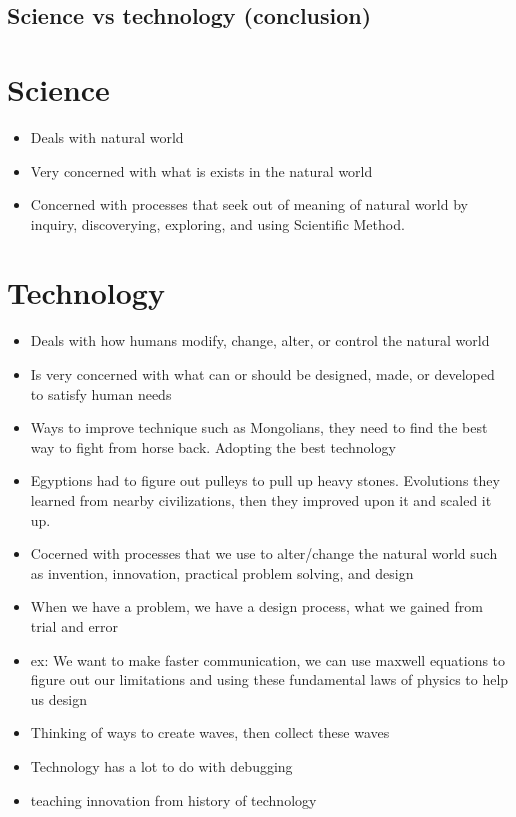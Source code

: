 \documentclass{article}
\begin{document}
\subsection{Science vs technology (conclusion)}

\section*{Science}
\begin{itemize}
  \item Deals with natural world
  \item Very concerned with what is {exists}
    in the natural world
  \item Concerned with processes that seek
    out of meaning of natural world by inquiry,
    discoverying, exploring, and using
    Scientific Method.
\end{itemize}

\section*{Technology}
\begin{itemize}
  \item Deals with how humans modify, change, alter,
    or control the natural world
  \item Is very concerned with what can or should be
    designed, made, or developed to satisfy human needs
  \item Ways to improve technique such as Mongolians,
    they need to find the best way to fight from
    horse back.
    Adopting the best technology
  \item Egyptions had to figure out pulleys
    to pull up heavy stones.
    Evolutions they learned from nearby
    civilizations, then they improved
    upon it and scaled it up.
  \item Cocerned with processes that we use to alter/change
    the natural world such as invention,
    innovation, practical problem solving, and design
  \item When we have a problem, we have a design process,
    what we gained from trial and error
  \item ex: We want to make faster communication,
    we can use maxwell equations to figure out our limitations
    and using these fundamental laws of physics to help us design
  \item Thinking of ways to create waves, then collect these waves
  \item Technology has a lot to do with debugging
  \item teaching innovation from history of technology
\end{itemize}
\end{document}
